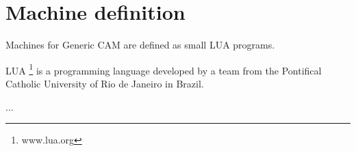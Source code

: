 \section{Machine definition}

Machines for Generic CAM are defined as small LUA programs.


LUA \footnote{www.lua.org} is a programming language developed by a team from the
Pontifical Catholic University of Rio de Janeiro in Brazil.


...